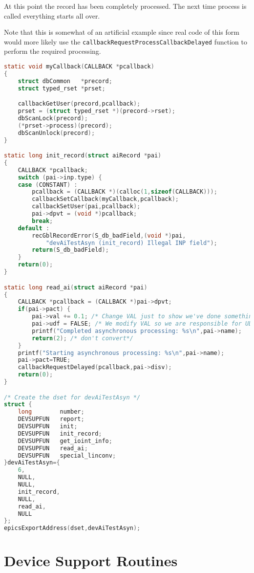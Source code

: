 At this point the record has been completely processed.
The next time process is called everything starts all over.

Note that this is somewhat of an artificial example since real code of this form would more likely use the \verb|callbackRequestProcessCallbackDelayed| function to perform the required processing.

\begin{lstlisting}[language=C]
static void myCallback(CALLBACK *pcallback)
{
    struct dbCommon   *precord;
    struct typed_rset *prset;

    callbackGetUser(precord,pcallback);
    prset = (struct typed_rset *)(precord->rset);
    dbScanLock(precord);
    (*prset->process)(precord);
    dbScanUnlock(precord);
}

static long init_record(struct aiRecord *pai)
{
    CALLBACK *pcallback;
    switch (pai->inp.type) {
    case (CONSTANT) :
        pcallback = (CALLBACK *)(calloc(1,sizeof(CALLBACK)));
        callbackSetCallback(myCallback,pcallback);
        callbackSetUser(pai,pcallback);
        pai->dpvt = (void *)pcallback;
        break;
    default :
        recGblRecordError(S_db_badField,(void *)pai,
            "devAiTestAsyn (init_record) Illegal INP field");
        return(S_db_badField);
    }
    return(0);
}

static long read_ai(struct aiRecord *pai)
{
    CALLBACK *pcallback = (CALLBACK *)pai->dpvt;
    if(pai->pact) {
        pai->val += 0.1; /* Change VAL just to show we've done something. */
        pai->udf = FALSE; /* We modify VAL so we are responsible for UDF too. */
        printf("Completed asynchronous processing: %s\n",pai->name);
        return(2); /* don't convert*/
    } 
    printf("Starting asynchronous processing: %s\n",pai->name);
    pai->pact=TRUE;
    callbackRequestDelayed(pcallback,pai->disv);
    return(0);
}

/* Create the dset for devAiTestAsyn */
struct {
    long        number;
    DEVSUPFUN   report;
    DEVSUPFUN   init;
    DEVSUPFUN   init_record;
    DEVSUPFUN   get_ioint_info;
    DEVSUPFUN   read_ai;
    DEVSUPFUN   special_linconv;
}devAiTestAsyn={
    6,
    NULL,
    NULL,
    init_record,
    NULL,
    read_ai,
    NULL
};
epicsExportAddress(dset,devAiTestAsyn);
\end{lstlisting}

\section{Device Support Routines}

